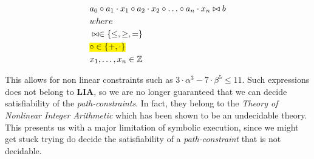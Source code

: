 	  
	 
	 \begin{align*}
	 	& a_0 \circ a_1 \cdot x_1 \circ a_2 \cdot x_2 \circ \ldots \circ a_n \cdot x_n \bowtie b \\
	 	& where \\
	 	& \bowtie \in  \{\leq, \geq, =\}\\
	 	& \text{\hl{$\circ \in  \{ +, \cdot \}$}}\\
	 	& x_1, \ldots, x_n \in \mathbb{Z}
	 \end{align*}
	
	This allows for non linear constraints such as $3 \cdot \alpha ^3 - 7\cdot \beta ^ 5 \leq 11$. Such expressions does not belong to \textbf{LIA}, so we are no longer guaranteed that we can decide satisfiability of the \emph{path-constraints}. In fact, they belong to the \emph{Theory of Nonlinear Integer Arithmetic} which has been shown to be an undecidable theory. %
	This presents us with a major limitation of symbolic execution, since we might get stuck trying do decide the satisfiability of a \emph{path-constraint} that is not decidable. 
	
	
	
	
	
	